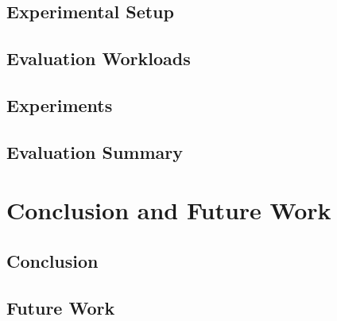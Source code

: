 \documentclass[UKenglish, a4paper]{ifimaster}
\begin{document}
    \section{Experimental Setup}
    \section{Evaluation Workloads}
    \section{Experiments}
    \section{Evaluation Summary}

\chapter{Conclusion and Future Work}
\label{ch:conclusion-and-future-work}
    \section{Conclusion}
    \section{Future Work}


\backmatter{}
\printbibliography{}
\end{document}
